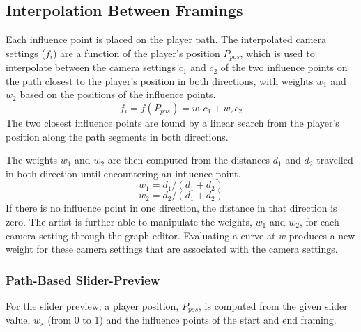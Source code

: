 \begin{verbatim}

\end{verbatim}

\subsection{Interpolation Between Framings} \label{interpolationChapter}
Each influence point is placed on the player path. The interpolated camera settings ($f_{i}$) are a function of the player's position $P_{pos}$, which is used to interpolate between the camera settings $c_1$ and $c_2$ of the two influence points on the path closest to the player's position in both directions, with weights $w_1$ and $w_2$ based on the positions of the influence points.
\begin{equation}
f_{i} = f(P_{pos}) = w_1c_1+w_2c_2
\end{equation}
The two closest influence points are found by a linear search from the player's position along the path segments in both directions.

The weights $w_1$ and $w_2$ are then computed from the distances $d_1$ and $d_2$ travelled in both direction until encountering an influence point.
\begin{equation}
w_1 = {d_1}/(d_1 + d_2)
\end{equation}
\begin{equation}
w_2 = {d_2}/(d_1 + d_2)
\end{equation}
If there is no influence point in one direction, the distance in that direction is zero. The artist is further able to manipulate the weights, $w_1$ and $w_2$, for each camera setting through the graph editor. Evaluating a curve at $w$ produces a new weight for these camera settings that are associated with the camera settings.


\subsubsection{Path-Based Slider-Preview}
For the slider preview, a player position, $P_{pos}$, is computed from the given slider value, $w_s$ (from 0 to 1) and the influence points of the start and end framing.

